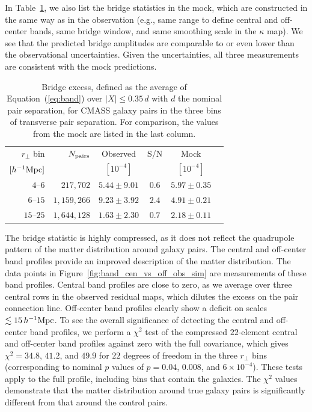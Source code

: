 \documentclass[twocolumn,anonymous,linenumbers]{aastex701}
\newcommand{\hinvMpc}{h^{-1}{\rm Mpc}}
\begin{document}
In Table~\ref{tab:bridge}, we also list the bridge statistics in the mock, which are constructed in the same way as in the observation (e.g., same range to define central and off-center bands, same bridge window, and same smoothing scale in the $\kappa$ map). We see that the predicted bridge amplitudes are comparable to or even lower than the observational uncertainties. Given the uncertainties, all three measurements are consistent with the mock predictions.


\begin{table}
  \centering
  \caption{Bridge excess, defined as the average of Equation~(\ref{eq:band})
  over $|X|\leq0.35\,d$ with $d$ the nominal pair separation, for CMASS galaxy pairs in the three bins of transverse pair separation. For comparison, the values from the mock are listed in the last column.}
  \label{tab:bridge}
  \begin{tabular}{rrcccc}
    \hline
    $r_{\perp}$ bin & $N_{\rm pairs}$ & Observed & S/N & Mock\\
    $[\hinvMpc]$ & & $[10^{-4}]$ & & $[10^{-4}]$ \\
    \hline
    $4$--$6$   & $217{,}702$     & $5.44\pm9.01$ & $0.6$ & $5.97\pm0.35$\\
    $6$--$15$  & $1{,}159{,}266$ & $9.23\pm3.92$ & $2.4$ & $4.91\pm0.21$\\
    $15$--$25$ & $1{,}644{,}128$ & $1.63\pm2.30$ & $0.7$ & $2.18\pm0.11$\\
    \hline
  \end{tabular}
\end{table}

The bridge statistic is highly compressed, as it does not reflect the quadrupole pattern of the matter distribution around galaxy pairs. The central and off-center band profiles provide an improved description of the matter distribution. The data points in Figure~\ref{fig:band_cen_vs_off_obs_sim}  are measurements of these band profiles. Central band profiles are close to zero, as we average over three central rows in the observed residual maps, which dilutes the excess on the pair connection line. Off-center band profiles clearly show a deficit on scales $\lesssim 15\,\hinvMpc$. To see the overall significance of detecting the central and off-center band profiles, we perform a $\chi^{2}$ test of the compressed $22$-element central and off-center band profiles against zero with the full covariance, which gives $\chi^{2}=34.8$, $41.2$, and $49.9$ for $22$ degrees of freedom in the three $r_\perp$ bins (corresponding to nominal $p$ values of $p=0.04$, $0.008$, and $6\times10^{-4}$). These tests apply to the full profile, including bins that contain the galaxies. The $\chi^2$ values demonstrate that the matter distribution around true galaxy pairs is significantly different from that around the control pairs.
\end{document}
